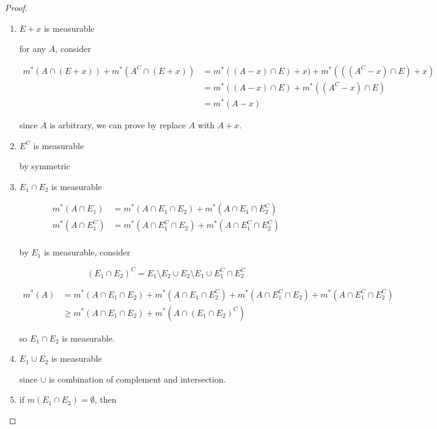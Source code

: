\begin{proof}
    \begin{enumerate}
        \item $E+x$ is measurable

        for any $A$, consider

        \begin{align}
            m^*(A \cap (E+x)) + m^*(A^C \cap (E+x)) &= m^*(\left(A -x\right)\cap E) + x) + m^*(((A^C-x) \cap E) + x) \\
            &= m^*(\left(A -x\right)\cap E) + m^*((A^C-x) \cap E) \\
            &= m^*(A-x)
        \end{align}

        since $A$ is arbitrary, we can prove by replace $A$ with $A +x$.

        \item $E^C$ is measurable

        by symmetric

        \item $E_1 \cap E_2$ is measurable

        \begin{align*}
            m^*(A \cap E_1) & = m^*(A \cap E_1\cap E_2) + m^*(A \cap E_1 \cap E_2^{C}) \\ 
            m^*(A \cap E_1^C) & = m^*(A \cap E_1^C \cap E_2) + m^*(A \cap E_1^{C} \cap E_2^C) \\ 
        \end{align*}

by $E_1$ is measurable, consider

\[
    (E_1 \cap E_2)^C = E_1 \setminus E_2 \cup E_2 \setminus E_1 \cup E_1^C \cap E_2^C
\]

\begin{align*}
m^*(A) &= m^*(A \cap E_1 \cap E_2) + m^*(A \cap E_1 \cap E_2^{C}) + m^*(A \cap E_1^{C} \cap E_2) + m^*(A \cap E_1^{C} \cap E_2^C) \\
& \ge m^*(A \cap E_1 \cap E_2) + m^*(A \cap (E_1 \cap E_2)^C) 
\end{align*}

so $E_1 \cap E_2$ is measurable.

    \item $E_1 \cup E_2$ is measurable
    
    since $\cup$ is combination of complement and intersection.


    \item if $m(E_1 \cap E_2) = \emptyset$, then


\end{enumerate}
\end{proof}
